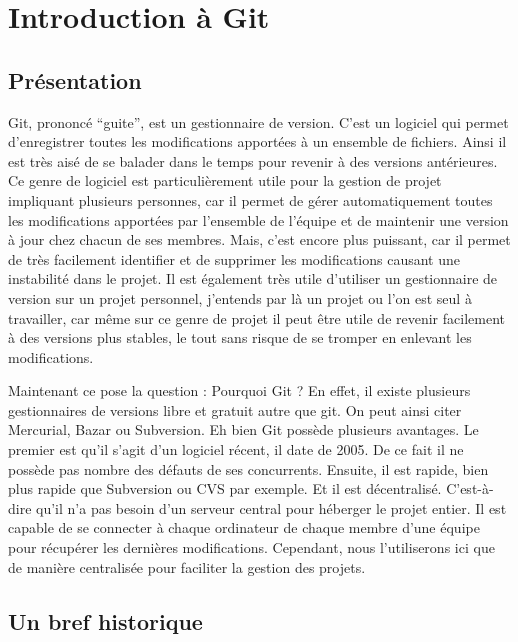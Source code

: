 \documentclass[a4paper]{article}
\begin{document}
\section{Introduction à Git}

\subsection{Présentation}

Git, prononcé “guite”, est un gestionnaire de version. C'est un logiciel qui permet d'enregistrer toutes les modifications apportées à un ensemble de fichiers. Ainsi il est très aisé de se \og balader dans le temps \fg pour revenir à des versions antérieures. Ce genre de logiciel est particulièrement utile pour la gestion de projet impliquant plusieurs personnes, car il permet de gérer automatiquement toutes les modifications apportées par l'ensemble de l'équipe et de maintenir une version à jour chez chacun de ses membres. Mais, c'est encore plus puissant, car il permet de très facilement identifier et de supprimer les modifications causant une instabilité dans le projet. Il est également très utile d'utiliser un gestionnaire de version sur un projet personnel, j'entends par là un projet ou l'on est seul à travailler, car même sur ce genre de projet il peut être utile de revenir facilement à des versions plus stables, le tout sans risque de se tromper en enlevant les modifications.

Maintenant ce pose la question : Pourquoi Git ? En effet, il existe plusieurs gestionnaires de versions libre et gratuit autre que git. On peut ainsi citer Mercurial, Bazar ou Subversion. Eh bien Git possède plusieurs avantages. Le premier est qu'il s'agit d'un logiciel récent, il date de 2005. De ce fait il ne possède pas nombre des défauts de ses concurrents. Ensuite, il est rapide, bien plus rapide que Subversion ou CVS par exemple. Et il est décentralisé. C'est-à-dire qu'il n'a pas besoin d'un serveur central pour héberger le projet entier. Il est capable de se connecter à chaque ordinateur de chaque membre d'une équipe pour récupérer les dernières modifications. Cependant, nous l'utiliserons ici que de manière centralisée pour faciliter la gestion des projets.

\subsection{Un bref historique}
\end{document}
